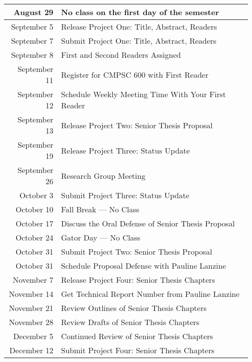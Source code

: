 \documentclass[11pt]{article}
\begin{document}
\begin{center}
\begin{longtable}{r|l}

\hline

August 29 & No class on the first day of the semester \\

\hline

September 5  & Release Project One: Title, Abstract, Readers       \\
September 7  & Submit Project One: Title, Abstract, Readers        \\
September 8  & First and Second Readers Assigned                   \\
September 11 & Register for CMPSC 600 with First Reader            \\
September 12 & Schedule Weekly Meeting Time With Your First Reader \\
September 13 & Release Project Two: Senior Thesis Proposal         \\
September 19 & Release Project Three: Status Update \\
September 26 & Research Group Meeting \\

\hline

October 3  & Submit Project Three: Status Update                \\
October 10 & Fall Break --- No Class                            \\
October 17 & Discuss the Oral Defense of Senior Thesis Proposal \\
October 24 & Gator Day --- No Class                             \\
October 31 & Submit Project Two: Senior Thesis Proposal         \\
October 31 & Schedule Proposal Defense with Pauline Lanzine     \\

\hline

November 7  & Release Project Four: Senior Thesis Chapters     \\
November 14 & Get Technical Report Number from Pauline Lanzine \\
November 21 & Review Outlines of Senior Thesis Chapters        \\
November 28 & Review Drafts of Senior Thesis Chapters          \\

\hline

December 5  & Continued Review of Senior Thesis Chapters  \\
December 12 & Submit Project Four: Senior Thesis Chapters \\


\end{longtable}
\end{center}
\end{document}
